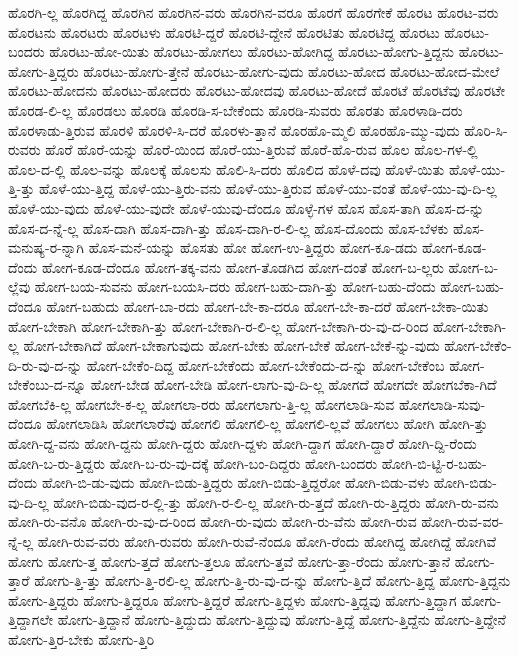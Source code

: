 {ಹೊರಗಿ-ಲ್ಲ
ಹೊರಗಿದ್ದ
ಹೊರಗಿನ
ಹೊರಗಿನ-ವರು
ಹೊರಗಿನ-ವರೂ
ಹೊರಗೆ
ಹೊರಗೇಕೆ
ಹೊರಟ
ಹೊರಟ-ವರು
ಹೊರಟನು
ಹೊರಟರು
ಹೊರಟಳು
ಹೊರಟಿ-ದ್ದರೆ
ಹೊರಟಿ-ದ್ದೇನೆ
ಹೊರಟಿತು
ಹೊರಟಿದ್ದ
ಹೊರಟು
ಹೊರಟು-ಬಂದರು
ಹೊರಟು-ಹೋ-ಯಿತು
ಹೊರಟು-ಹೋಗಲು
ಹೊರಟು-ಹೋಗಿದ್ದ
ಹೊರಟು-ಹೋಗು-ತ್ತಿದ್ದನು
ಹೊರಟು-ಹೋಗು-ತ್ತಿದ್ದರು
ಹೊರಟು-ಹೋಗು-ತ್ತೇನೆ
ಹೊರಟು-ಹೋಗು-ವುದು
ಹೊರಟು-ಹೋದ
ಹೊರಟು-ಹೋದ-ಮೇಲೆ
ಹೊರಟು-ಹೋದನು
ಹೊರಟು-ಹೋದರು
ಹೊರಟು-ಹೋದವು
ಹೊರಟು-ಹೋದೆ
ಹೊರಟೆ
ಹೊರಟೆವು
ಹೊರಟೇ
ಹೊರಡ-ಲಿ-ಲ್ಲ
ಹೊರಡಲು
ಹೊರಡಿ
ಹೊರಡಿ-ಸ-ಬೇಕೆಂದು
ಹೊರಡಿ-ಸುವರು
ಹೊರತು
ಹೊರಳಾಡಿ-ದರು
ಹೊರಳಾಡು-ತ್ತಿರುವ
ಹೊರಳಿ
ಹೊರಳಿ-ಸಿ-ದರೆ
ಹೊರಳು-ತ್ತಾನೆ
ಹೊರಹೊ-ಮ್ಮಲಿ
ಹೊರಹೊ-ಮ್ಮು-ವುದು
ಹೊರಿ-ಸಿ-ರುವರು
ಹೊರೆ
ಹೊರೆ-ಯನ್ನು
ಹೊರೆ-ಯಿಂದ
ಹೊರೆ-ಯು-ತ್ತಿರುವೆ
ಹೊರೆ-ಹೊ-ರುವ
ಹೊಲ
ಹೊಲ-ಗಳ-ಲ್ಲಿ
ಹೊಲ-ದ-ಲ್ಲಿ
ಹೊಲ-ವನ್ನು
ಹೊಲಕ್ಕೆ
ಹೊಲಸು
ಹೊಲಿ-ಸಿ-ದರು
ಹೊಲಿದ
ಹೊಳೆ-ದವು
ಹೊಳೆ-ಯಿತು
ಹೊಳೆ-ಯು-ತ್ತಿ-ತ್ತು
ಹೊಳೆ-ಯು-ತ್ತಿದ್ದ
ಹೊಳೆ-ಯು-ತ್ತಿರು-ವನು
ಹೊಳೆ-ಯು-ತ್ತಿರುವ
ಹೊಳೆ-ಯು-ವಂತೆ
ಹೊಳೆ-ಯು-ವು-ದಿ-ಲ್ಲ
ಹೊಳೆ-ಯು-ವುದು
ಹೊಳೆ-ಯು-ವುದೇ
ಹೊಳೆ-ಯುವು-ದೆಂದೂ
ಹೊಳ್ಳೆ-ಗಳ
ಹೊಸ
ಹೊಸ-ತಾಗಿ
ಹೊಸ-ದ-ನ್ನು
ಹೊಸ-ದ-ನ್ನೆ-ಲ್ಲ
ಹೊಸ-ದಾಗಿ
ಹೊಸ-ದಾಗಿ-ತ್ತು
ಹೊಸ-ದಾಗಿ-ರ-ಲಿ-ಲ್ಲ
ಹೊಸ-ದೊಂದು
ಹೊಸ-ಬೆಳಕು
ಹೊಸ-ಮನುಷ್ಯ-ರ-ನ್ನಾಗಿ
ಹೊಸ-ಮನೆ-ಯನ್ನು
ಹೊಸತು
ಹೋ
ಹೋಗ-ಉ-ತ್ತಿದ್ದರು
ಹೋಗ-ಕೂ-ಡದು
ಹೋಗ-ಕೂಡ-ದೆಂದು
ಹೋಗ-ಕೂಡ-ದೆಂದೂ
ಹೋಗ-ತಕ್ಕ-ವನು
ಹೋಗ-ತೊಡಗಿದ
ಹೋಗ-ದಂತೆ
ಹೋಗ-ಬ-ಲ್ಲರು
ಹೋಗ-ಬ-ಲ್ಲೆವು
ಹೋಗ-ಬಯ-ಸುವನು
ಹೋಗ-ಬಯಸಿ-ದರು
ಹೋಗ-ಬಹು-ದಾಗಿ-ತ್ತು
ಹೋಗ-ಬಹು-ದೆಂದು
ಹೋಗ-ಬಹು-ದೆಂದೂ
ಹೋಗ-ಬಹುದು
ಹೋಗ-ಬಾ-ರದು
ಹೋಗ-ಬೇ-ಕಾ-ದರೂ
ಹೋಗ-ಬೇ-ಕಾ-ದರೆ
ಹೋಗ-ಬೇಕಾ-ಯಿತು
ಹೋಗ-ಬೇಕಾಗಿ
ಹೋಗ-ಬೇಕಾಗಿ-ತ್ತು
ಹೋಗ-ಬೇಕಾಗಿ-ರ-ಲಿ-ಲ್ಲ
ಹೋಗ-ಬೇಕಾಗಿ-ರು-ವು-ದ-ರಿಂದ
ಹೋಗ-ಬೇಕಾಗಿ-ಲ್ಲ
ಹೋಗ-ಬೇಕಾಗಿದೆ
ಹೋಗ-ಬೇಕಾಗುವುದು
ಹೋಗ-ಬೇಕು
ಹೋಗ-ಬೇಕೆ
ಹೋಗ-ಬೇಕೆ-ನ್ನು-ವುದು
ಹೋಗ-ಬೇಕೆಂ-ದಿ-ರು-ವು-ದ-ನ್ನು
ಹೋಗ-ಬೇಕೆಂ-ದಿದ್ದ
ಹೋಗ-ಬೇಕೆಂದು
ಹೋಗ-ಬೇಕೆಂದು-ದ-ನ್ನು
ಹೋಗ-ಬೇಕೆಂಬ
ಹೋಗ-ಬೇಕೆಂಬು-ದ-ನ್ನೂ
ಹೋಗ-ಬೇಡ
ಹೋಗ-ಬೇಡಿ
ಹೋಗ-ಲಾಗು-ವು-ದಿ-ಲ್ಲ
ಹೋಗದೆ
ಹೋಗದೇ
ಹೋಗಬೆಕಾ-ಗಿದೆ
ಹೋಗಬೆಕಿ-ಲ್ಲ
ಹೋಗಬೇ-ಕ-ಲ್ಲ
ಹೋಗಲಾ-ರರು
ಹೋಗಲಾಗು-ತ್ತಿ-ಲ್ಲ
ಹೋಗಲಾಡಿ-ಸುವ
ಹೋಗಲಾಡಿ-ಸುವು-ದೆಂದೂ
ಹೋಗಲಾಡಿಸಿ
ಹೋಗಲಾರೆವು
ಹೋಗಲಿ
ಹೋಗಲಿ-ಲ್ಲ
ಹೋಗಲಿ-ಲ್ಲವೆ
ಹೋಗಲು
ಹೋಗಿ
ಹೋಗಿ-ತ್ತು
ಹೋಗಿ-ದ್ದ-ವನು
ಹೋಗಿ-ದ್ದನು
ಹೋಗಿ-ದ್ದರು
ಹೋಗಿ-ದ್ದಳು
ಹೋಗಿ-ದ್ದಾಗ
ಹೋಗಿ-ದ್ದಾರೆ
ಹೋಗಿ-ದ್ದಿ-ರೆಂದು
ಹೋಗಿ-ಬ-ರು-ತ್ತಿದ್ದರು
ಹೋಗಿ-ಬ-ರು-ವು-ದಕ್ಕೆ
ಹೋಗಿ-ಬಂ-ದಿದ್ದರು
ಹೋಗಿ-ಬಂದರು
ಹೋಗಿ-ಬಿ-ಟ್ಟಿ-ರ-ಬಹು-ದೆಂದು
ಹೋಗಿ-ಬಿ-ಡು-ವುದು
ಹೋಗಿ-ಬಿಡು-ತ್ತಿದ್ದರು
ಹೋಗಿ-ಬಿಡು-ತ್ತಿದ್ದರೋ
ಹೋಗಿ-ಬಿಡು-ವಳು
ಹೋಗಿ-ಬಿಡು-ವು-ದಿ-ಲ್ಲ
ಹೋಗಿ-ಬಿಡು-ವುದ-ರ-ಲ್ಲಿ-ತ್ತು
ಹೋಗಿ-ರ-ಲಿ-ಲ್ಲ
ಹೋಗಿ-ರು-ತ್ತದೆ
ಹೋಗಿ-ರು-ತ್ತಿದ್ದರು
ಹೋಗಿ-ರು-ವನು
ಹೋಗಿ-ರು-ವನೊ
ಹೋಗಿ-ರು-ವು-ದ-ರಿಂದ
ಹೋಗಿ-ರು-ವುದು
ಹೋಗಿ-ರು-ವೆನು
ಹೋಗಿ-ರುವ
ಹೋಗಿ-ರುವ-ವರ-ನ್ನೆ-ಲ್ಲ
ಹೋಗಿ-ರುವ-ವರು
ಹೋಗಿ-ರುವರು
ಹೋಗಿ-ರುವೆ-ನೆಂದೂ
ಹೋಗಿ-ರೆಂದು
ಹೋಗಿದ್ದ
ಹೋಗಿದ್ದೆ
ಹೋಗಿವೆ
ಹೋಗು
ಹೋಗು-ತ್ತ
ಹೋಗು-ತ್ತದೆ
ಹೋಗು-ತ್ತಲೂ
ಹೋಗು-ತ್ತವೆ
ಹೋಗು-ತ್ತಾ-ರೆಂದು
ಹೋಗು-ತ್ತಾನೆ
ಹೋಗು-ತ್ತಾರೆ
ಹೋಗು-ತ್ತಿ-ತ್ತು
ಹೋಗು-ತ್ತಿ-ರಲಿ-ಲ್ಲ
ಹೋಗು-ತ್ತಿ-ರು-ವು-ದ-ನ್ನು
ಹೋಗು-ತ್ತಿದೆ
ಹೋಗು-ತ್ತಿದ್ದ
ಹೋಗು-ತ್ತಿದ್ದನು
ಹೋಗು-ತ್ತಿದ್ದರು
ಹೋಗು-ತ್ತಿದ್ದರೂ
ಹೋಗು-ತ್ತಿದ್ದರೆ
ಹೋಗು-ತ್ತಿದ್ದಳು
ಹೋಗು-ತ್ತಿದ್ದವು
ಹೋಗು-ತ್ತಿದ್ದಾಗ
ಹೋಗು-ತ್ತಿದ್ದಾಗಲೇ
ಹೋಗು-ತ್ತಿದ್ದಾನೆ
ಹೋಗು-ತ್ತಿದ್ದುದು
ಹೋಗು-ತ್ತಿದ್ದುವು
ಹೋಗು-ತ್ತಿದ್ದೆ
ಹೋಗು-ತ್ತಿದ್ದೆನು
ಹೋಗು-ತ್ತಿದ್ದೇನೆ
ಹೋಗು-ತ್ತಿರ-ಬೇಕು
ಹೋಗು-ತ್ತಿರಿ
}
